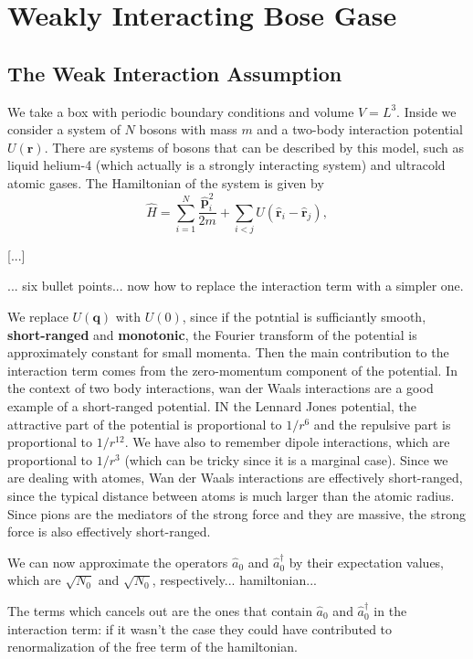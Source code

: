 \chapter{Weakly Interacting Bose Gase}

\section{The Weak Interaction Assumption}

We take a box with periodic boundary conditions and volume $V=L^3$. Inside we consider a system of $N$ bosons with mass $m$ and a two-body interaction potential $U(\mathbf{r})$. There are systems of bosons that can be described by this model, such as liquid helium-4 (which actually is a strongly interacting system) and ultracold atomic gases. The Hamiltonian of the system is given by
\[
    \hat{H} = \sum_{i= 1}^N \frac{\hat{\mathbf{p}}_i^2}{2m} + \sum_{i<j} U(\hat{\mathbf{r}}_i - \hat{\mathbf{r}}_j),
\]

[...]

... six bullet points... now how to replace the interaction term with a simpler one.

We replace \(U(\mathbf{q})\)  with \(U(0)\), since if the potntial is sufficiantly smooth, \textbf{short-ranged} and \textbf{monotonic}, the Fourier transform of the potential is approximately constant for small momenta. Then the main contribution to the interaction term comes from the zero-momentum component of the potential. In the context of two body interactions, wan der Waals interactions are a good example of a short-ranged potential. IN the Lennard Jones potential, the attractive part of the potential is proportional to \(1/r^6\) and the repulsive part is proportional to \(1/r^{12}\). We have also to remember dipole interactions, which are proportional to \(1/r^3\) (which can be tricky since it is a marginal case). Since we are dealing with atomes, Wan der Waals interactions are effectively short-ranged, since the typical distance between atoms is much larger than the atomic radius. Since pions are the mediators of the strong force and they are massive, the strong force is also effectively short-ranged.

We can now approximate the operators \(\hat{a}_0\) and \(\hat{a}_0^\dagger\) by their expectation values, which are \(\sqrt{N_0}\) and \(\sqrt{N_0}\), respectively... hamiltonian...

The terms which cancels out are the ones that contain \(\hat{a}_0\) and \(\hat{a}_0^\dagger\) in the interaction term: if it wasn't the case they could have contributed to renormalization of the free term of the hamiltonian.

